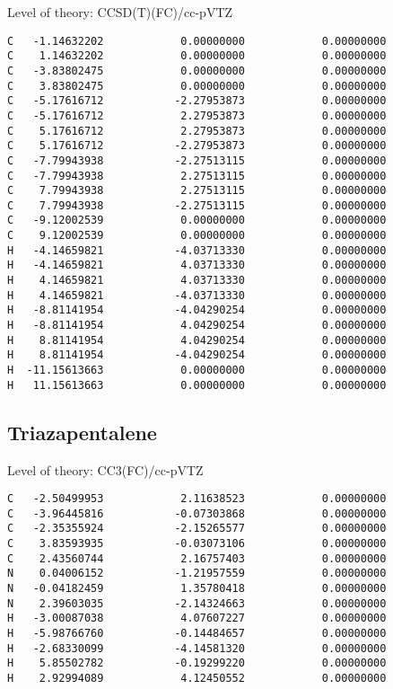\documentclass[journal=jctcce,manuscript=article,layout=traditional]{achemso}
\newcommand{\TZ}{cc-pVTZ}
\begin{document}
\begin{singlespace}
Level of theory: CCSD(T)(FC)/{\TZ}
\begin{verbatim}
C   -1.14632202            0.00000000            0.00000000
C    1.14632202            0.00000000            0.00000000
C   -3.83802475            0.00000000            0.00000000
C    3.83802475            0.00000000            0.00000000
C   -5.17616712           -2.27953873            0.00000000
C   -5.17616712            2.27953873            0.00000000
C    5.17616712            2.27953873            0.00000000
C    5.17616712           -2.27953873            0.00000000
C   -7.79943938           -2.27513115            0.00000000
C   -7.79943938            2.27513115            0.00000000
C    7.79943938            2.27513115            0.00000000
C    7.79943938           -2.27513115            0.00000000
C   -9.12002539            0.00000000            0.00000000
C    9.12002539            0.00000000            0.00000000
H   -4.14659821           -4.03713330            0.00000000
H   -4.14659821            4.03713330            0.00000000
H    4.14659821            4.03713330            0.00000000
H    4.14659821           -4.03713330            0.00000000
H   -8.81141954           -4.04290254            0.00000000
H   -8.81141954            4.04290254            0.00000000
H    8.81141954            4.04290254            0.00000000
H    8.81141954           -4.04290254            0.00000000
H  -11.15613663            0.00000000            0.00000000
H   11.15613663            0.00000000            0.00000000
\end{verbatim}
\end{singlespace}

\subsection*{Triazapentalene}

\begin{singlespace}
Level of theory: CC3(FC)/{\TZ}
\begin{verbatim}
C   -2.50499953            2.11638523            0.00000000
C   -3.96445816           -0.07303868            0.00000000
C   -2.35355924           -2.15265577            0.00000000
C    3.83593935           -0.03073106            0.00000000
C    2.43560744            2.16757403            0.00000000
N    0.04006152           -1.21957559            0.00000000
N   -0.04182459            1.35780418            0.00000000
N    2.39603035           -2.14324663            0.00000000
H   -3.00087038            4.07607227            0.00000000
H   -5.98766760           -0.14484657            0.00000000
H   -2.68330099           -4.14581320            0.00000000
H    5.85502782           -0.19299220            0.00000000
H    2.92994089            4.12450552            0.00000000
\end{verbatim}
\end{singlespace}
\end{document}
